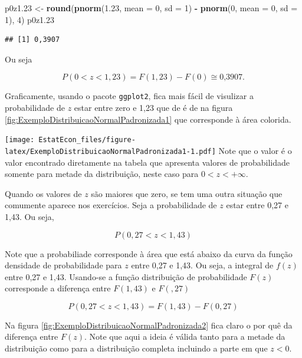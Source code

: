\documentclass[
]{book}
\newenvironment{Shaded}{\begin{snugshade}}{\end{snugshade}}
\newcommand{\DataTypeTok}[1]{\textcolor[rgb]{0.13,0.29,0.53}{#1}}
\newcommand{\DecValTok}[1]{\textcolor[rgb]{0.00,0.00,0.81}{#1}}
\newcommand{\FloatTok}[1]{\textcolor[rgb]{0.00,0.00,0.81}{#1}}
\newcommand{\KeywordTok}[1]{\textcolor[rgb]{0.13,0.29,0.53}{\textbf{#1}}}
\newcommand{\NormalTok}[1]{#1}
\newcommand{\OperatorTok}[1]{\textcolor[rgb]{0.81,0.36,0.00}{\textbf{#1}}}
\newcommand{\StringTok}[1]{\textcolor[rgb]{0.31,0.60,0.02}{#1}}
\begin{document}
\begin{Shaded}
\begin{Highlighting}[]
\NormalTok{p0z1}\FloatTok{.23}\NormalTok{ <-}\StringTok{ }\KeywordTok{round}\NormalTok{(}\KeywordTok{pnorm}\NormalTok{(}\FloatTok{1.23}\NormalTok{, }\DataTypeTok{mean =} \DecValTok{0}\NormalTok{, }\DataTypeTok{sd =} \DecValTok{1}\NormalTok{) }\OperatorTok{-}\StringTok{ }\KeywordTok{pnorm}\NormalTok{(}\DecValTok{0}\NormalTok{, }
    \DataTypeTok{mean =} \DecValTok{0}\NormalTok{, }\DataTypeTok{sd =} \DecValTok{1}\NormalTok{), }\DecValTok{4}\NormalTok{)}
\NormalTok{p0z1}\FloatTok{.23}
\end{Highlighting}
\end{Shaded}

\begin{verbatim}
## [1] 0,3907
\end{verbatim}

Ou seja

\[
  P(0 < z < 1,23) = F(1,23) - F(0) \cong \text{0,3907}.
\]

Graficamente, usando o pacote \texttt{ggplot2}, fica mais fácil de visulizar a probabilidade de \(z\) estar entre zero e 1,23 que de é de  na figura \ref{fig:ExemploDistribuicaoNormalPadronizada1} que corresponde à área colorida.

\texttt{[image: EstatEcon\_files/figure-latex/ExemploDistribuicaoNormalPadronizada1-1.pdf]}
Note que o valor  é o valor encontrado diretamente na tabela que apresenta valores de probabilidade somente para metade da distribuição, neste caso para \(0<z<+\infty\).

Quando os valores de \(z\) são maiores que zero, se tem uma outra situação que comumente aparece nos exercícios. Seja a probabilidade de \(z\) estar entre 0,27 e 1,43. Ou seja,

\[
  P(0,27 < z < 1,43) 
\]

Note que a probabiliade corresponde à área que está abaixo da curva da função densidade de probabilidade para \(z\) entre 0,27 e 1,43. Ou seja, a integral de \(f(z)\) entre 0,27 e 1,43. Usando-se a função distribuição de probabilidade \(F(z)\) corresponde a diferença entre \(F(1,43)\) e \(F(,27)\)

\[
  P(0,27 < z < 1,43) = F(1,43) - F(0,27)
\]

Na figura \ref{fig:ExemploDistribuicaoNormalPadronizada2} fica claro o por quê da diferença entre \(F(z)\). Note que aqui a ideia é válida tanto para a metade da distribuição como para a distribuição completa incluindo a parte em que \(z<0\).
\end{document}
